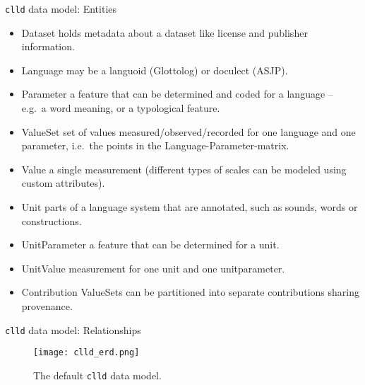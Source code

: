 \documentclass{beamer}
\begin{document}
\begin{frame}{\texttt{clld} data model: Entities}
\begin{itemize}
\item {\color{darkred}Dataset} {\scriptsize holds metadata about a dataset like license and publisher information.}
\item {\color{darkred}Language} {\scriptsize may be a languoid (Glottolog) or doculect (ASJP).}
\item {\color{darkred}Parameter} {\scriptsize a feature that can be determined and coded for a language – e.g.~a
word meaning, or a typological feature.}
\item {\color{darkred}ValueSet} {\scriptsize set of values
measured/observed/recorded for one language and one parameter,
i.e.~the points in the Language-Parameter-matrix.}
\item {\color{darkred}Value} {\scriptsize a single measurement (different types of scales
can be modeled using custom attributes).
}
\item {\color{darkred}Unit} {\scriptsize parts of a language system that are annotated, such as sounds, words or constructions.}
\item {\color{darkred}UnitParameter} {\scriptsize a feature that can be determined for a unit.}
\item {\color{darkred}UnitValue} {\scriptsize measurement for one unit and one unitparameter.}
\item {\color{darkred}Contribution} {\scriptsize ValueSets can be partitioned into separate contributions sharing provenance.}
\end{itemize}
\end{frame}



\begin{frame}{\texttt{clld} data model: Relationships}
\begin{figure}
\texttt{[image: clld\_erd.png]}
\caption{\label{fig:clld}The default \texttt{clld} data model.}
\end{figure}
\end{frame}
\end{document}
